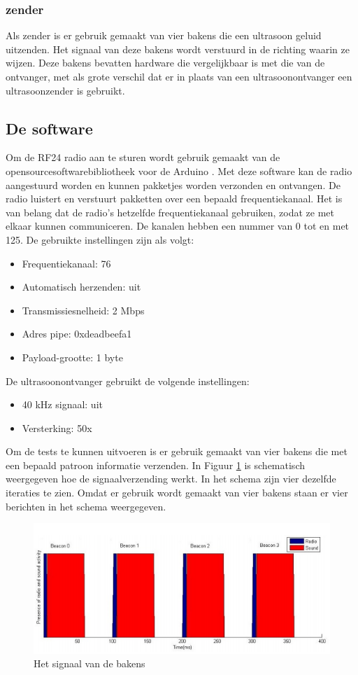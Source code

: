 \documentclass{article}
\begin{document}
\subsubsection{zender}
Als zender is er gebruik gemaakt van vier bakens die een ultrasoon geluid uitzenden. Het signaal van deze bakens wordt verstuurd in de richting waarin ze wijzen. Deze bakens bevatten hardware die vergelijkbaar is met die van de ontvanger, met als grote verschil dat er in plaats van een ultrasoonontvanger een ultrasoonzender is gebruikt.
\\

\subsection{De software}
Om de RF24 radio aan te sturen wordt gebruik gemaakt van de opensourcesoftwarebibliotheek voor de Arduino \cite{rf24}. Met deze software kan de radio aangestuurd worden en kunnen pakketjes worden verzonden en ontvangen. De radio luistert en verstuurt pakketten over een bepaald frequentiekanaal. Het is van belang dat de radio's hetzelfde frequentiekanaal gebruiken, zodat ze met elkaar kunnen communiceren. De kanalen hebben een nummer van 0 tot en met 125. De gebruikte instellingen zijn als volgt:
\begin{itemize}
	\item Frequentiekanaal: 76 
	\item Automatisch herzenden: uit
	\item Transmissiesnelheid: 2 Mbps
	\item Adres pipe: 0xdeadbeefa1
	\item Payload-grootte: 1 byte
\end{itemize}
De ultrasoonontvanger gebruikt de volgende instellingen:
\begin{itemize}
	\item 40 kHz signaal: uit
	\item Versterking: 50x
\end{itemize}
Om de tests te kunnen uitvoeren is er gebruik gemaakt van vier bakens die met een bepaald patroon informatie verzenden. In Figuur \ref{uitzenden_bakens} is schematisch weergegeven hoe de signaalverzending werkt. In het schema zijn vier dezelfde iteraties te zien. Omdat er gebruik wordt gemaakt van vier bakens staan er vier berichten in het schema weergegeven. 
\begin{figure}[h]
\centering\includegraphics[]{berichten_bakens.png}
\caption{Het signaal van de bakens}
\label{uitzenden_bakens}
\end{figure}
\end{document}
